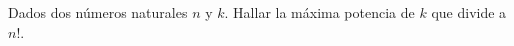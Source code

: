 \begin{statement}{9}
  Dados dos n\'umeros naturales $n$ y $k$. Hallar la m\'axima potencia de $k$
  que divide a $n!$.
\end{statement}